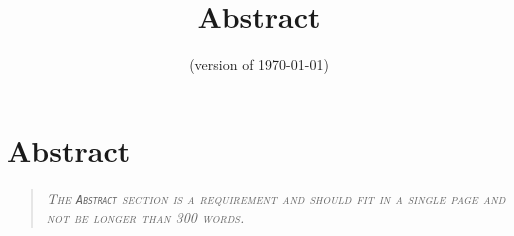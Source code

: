 \documentclass[../thesis]{subfiles}
\title{Abstract}
\date{(version of \today)} \author{}
\begin{document}

\chapter{Abstract}
\vspace*{-2em}\begin{quote}
\centering \scshape \itshape The \texttt{Abstract} section is a requirement and should fit in a single page and not be longer than 300 words.
\end{quote}
\end{document}
